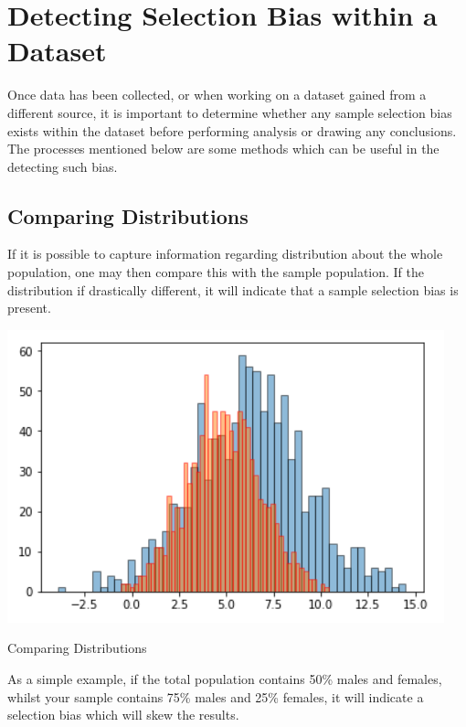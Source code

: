 	
	\section{Detecting Selection Bias within a Dataset}
	
	Once data has been collected, or when working on a dataset gained from a different source, it is important to determine whether any sample selection bias exists within the dataset before performing analysis or drawing any conclusions. The processes mentioned below are some methods which can be useful in the detecting such bias.
	
	\subsection{Comparing Distributions}
	
	If it is possible to capture information regarding distribution about the whole population, one may then compare this with the sample population. If the distribution if drastically different, it will indicate that a sample selection bias is present.
	
	\begin{marginfigure}
	\centering
  		\includegraphics[width=\linewidth]{graphics/sample_selection_bias/Distributions.png}
  		\caption{Comparing Distributions}
  		\label{fig:comparing-distributions}
	\end{marginfigure}

As a simple example, if the total population contains 50\% males and females, whilst your sample contains 75\% males and 25\% females, it will indicate a selection bias which will skew the results.

